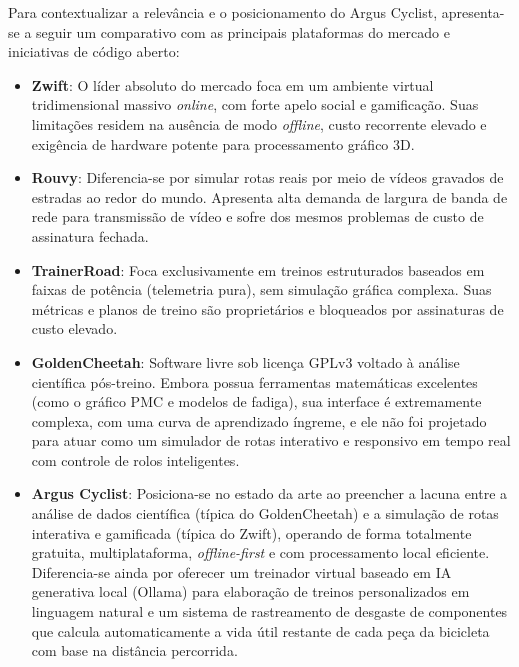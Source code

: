 \documentclass[
    a4paper,
    12pt,
    oneside,
    english,
    brazil,
    chapter=TITLE,
    section=TITLE,
]{abntex2}
\begin{document}
Para contextualizar a relevância e o posicionamento do Argus Cyclist, apresenta-se a seguir um comparativo com as principais plataformas do mercado e iniciativas de código aberto:

\begin{itemize}
    \item \textbf{Zwift}: O líder absoluto do mercado foca em um ambiente virtual tridimensional massivo \textit{online}, com forte apelo social e gamificação. Suas limitações residem na ausência de modo \textit{offline}, custo recorrente elevado e exigência de hardware potente para processamento gráfico 3D.
    \item \textbf{Rouvy}: Diferencia-se por simular rotas reais por meio de vídeos gravados de estradas ao redor do mundo. Apresenta alta demanda de largura de banda de rede para transmissão de vídeo e sofre dos mesmos problemas de custo de assinatura fechada.
    \item \textbf{TrainerRoad}: Foca exclusivamente em treinos estruturados baseados em faixas de potência (telemetria pura), sem simulação gráfica complexa. Suas métricas e planos de treino são proprietários e bloqueados por assinaturas de custo elevado.
    \item \textbf{GoldenCheetah}: Software livre sob licença GPLv3 voltado à análise científica pós-treino. Embora possua ferramentas matemáticas excelentes (como o gráfico PMC e modelos de fadiga), sua interface é extremamente complexa, com uma curva de aprendizado íngreme, e ele não foi projetado para atuar como um simulador de rotas interativo e responsivo em tempo real com controle de rolos inteligentes.
    \item \textbf{Argus Cyclist}: Posiciona-se no estado da arte ao preencher a lacuna entre a análise de dados científica (típica do GoldenCheetah) e a simulação de rotas interativa e gamificada (típica do Zwift), operando de forma totalmente gratuita, multiplataforma, \textit{offline-first} e com processamento local eficiente. Diferencia-se ainda por oferecer um treinador virtual baseado em IA generativa local (Ollama) \cite{ollama2024} para elaboração de treinos personalizados em linguagem natural e um sistema de rastreamento de desgaste de componentes que calcula automaticamente a vida útil restante de cada peça da bicicleta com base na distância percorrida.
\end{itemize}
\end{document}
